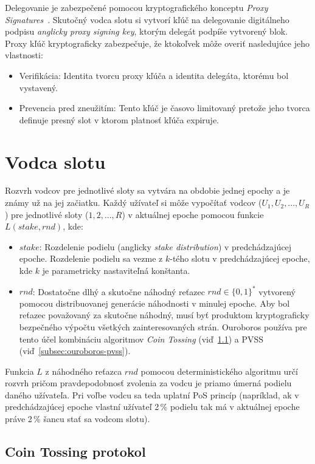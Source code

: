 Delegovanie je zabezpečené pomocou kryptografického konceptu \textit{Proxy Signatures}~\cite{proxySig}. Skutočný vodca slotu si vytvorí kľúč na delegovanie digitálneho podpisu \textit{anglicky proxy signing key}, ktorým delegát podpíše vytvorený blok. Proxy kľúč kryptograficky zabezpečuje, že ktokoľvek môže overiť nasledujúce jeho vlastnosti:
\begin{itemize}
	\item Verifikácia: Identita tvorcu proxy kľúča a identita delegáta, ktorému bol vystavený.
	\item Prevencia pred zneužitím: Tento kľúč je časovo limitovaný pretože jeho tvorca definuje presný slot v ktorom platnosť kľúča expiruje. 
\end{itemize}

\section{Vodca slotu}\label{sec:ouroboros-slot-leader}

Rozvrh vodcov pre jednotlivé sloty sa vytvára na obdobie jednej epochy a je známy už na jej začiatku. Každý užívateľ si môže vypočítať vodcov ($U_1, U_2,  ..., U_R$) pre jednotlivé sloty ($1, 2, ..., R$) v aktuálnej epoche pomocou funkcie $L(stake, rnd)$, kde:
\begin{itemize}
	\item $stake$: Rozdelenie podielu (anglicky \textit{stake distribution}) v predchádzajúcej epoche. Rozdelenie podielu sa vezme z $k$-tého slotu v predchádzajúcej epoche, kde $k$ je parametricky nastaviteľná konštanta.
	\item $rnd$: Dostatočne dlhý a skutočne náhodný reťazec $rnd \in \{0,1\}^*$ vytvorený pomocou distribuovanej generácie náhodnosti v minulej epoche. Aby bol reťazec považovaný za skutočne náhodný, musí byť produktom kryptograficky bezpečného výpočtu všetkých zainteresovaných strán. Ouroboros používa pre tento účel kombináciu algoritmov \textit{Coin Tossing} (viď~\ref{subsec:ouroboros-coin-tossing}) a PVSS (viď~\ref{subsec:ouroboros-pvss}).
\end{itemize}
Funkcia $L$ z náhodného reťazca $rnd$ pomocou deterministického algoritmu určí rozvrh pričom pravdepodobnosť zvolenia za vodcu je priamo úmerná podielu daného užívateľa. Pri voľbe vodcu sa teda uplatní PoS princíp (napríklad, ak v predchádzajúcej epoche vlastní užívateľ 2\,\% podielu tak má v aktuálnej epoche práve 2\,\% šancu stať sa vodcom slotu).

\subsection{Coin Tossing protokol}\label{subsec:ouroboros-coin-tossing}

